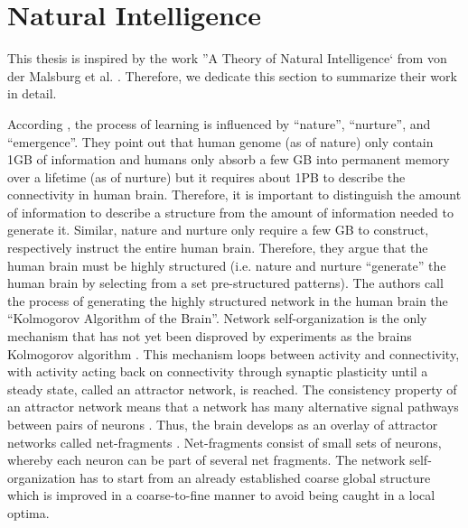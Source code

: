 
\section{Natural Intelligence}
This thesis is inspired by the work ''A Theory of Natural Intelligence` from von der Malsburg et al. .
Therefore, we dedicate this section to summarize their work in detail.

According \cite{von_der_Malsburg_Stadelmann_Grewe_2022}, the process of learning is influenced by ``nature'', ``nurture'', and ``emergence''.
They point out that human genome (as of nature) only contain 1GB of information  and humans only absorb a few GB into permanent memory over a lifetime (as of nurture) but it requires about 1PB to describe the connectivity in human brain.
Therefore, it is important to distinguish the amount of information to describe a structure from the amount of information needed to generate it.
Similar, nature and nurture only require a few GB to construct, respectively instruct the entire human brain.
Therefore, they argue that the human brain must be highly structured (i.e. nature and nurture ``generate'' the human brain by selecting from a set pre-structured patterns).
The authors call the process of generating the highly structured network in the human brain the ``Kolmogorov  Algorithm of the Brain''.
Network self-organization is the only mechanism that has not yet been disproved by experiments as the brains Kolmogorov algorithm .
This mechanism loops between activity and connectivity, with activity acting back on connectivity through synaptic plasticity until a steady state, called an attractor network, is reached.
The consistency property of an attractor network means that a network has many alternative signal pathways between pairs of neurons .
Thus, the brain develops as an overlay of attractor networks called net-fragments .
Net-fragments consist of small sets of neurons, whereby each neuron can be part of several net fragments.
The network self-organization has to start from an already established coarse global structure which is improved in a coarse-to-fine manner to avoid being caught in a local optima.

